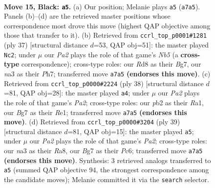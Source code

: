 \documentclass[11pt]{article}
\begin{document}
\clearpage

\begin{figure}[p]\centering
\begin{subfigure}{0.46\textwidth}\centering
\resizebox{\linewidth}{!}{%
\newchessgame
\chessboard[
  setfen={2kr2r1/ppp1ppbp/1n4p1/4n3/7P/NB3P2/PPP1KP2/R1B3R1 b - - 1 15},
  showmover=false,
  pgfstyle=straightmove, color=movearrow, markmove={a7-a5}
]}
\caption{}
\end{subfigure}\hfill
\begin{subfigure}{0.46\textwidth}\centering
\resizebox{\linewidth}{!}{%
\newchessgame
\chessboard[
  setfen={r2r2k1/pp3pbp/3P1np1/P3p3/1np5/2N2B1P/1P3PP1/R1BR2K1 b - - 0 19},
  showmover=false,
  pgfstyle=straightmove, color=movearrow, markmove={b4-c2}
]}
\caption{}
\end{subfigure}
\\[4pt]
\begin{subfigure}{0.46\textwidth}\centering
\resizebox{\linewidth}{!}{%
\newchessgame
\chessboard[
  setfen={4rbk1/5pp1/r1p4p/p1pnNb2/2N5/2P3B1/PP3PPP/R3R1K1 w - - 4 20},
  showmover=false,
  pgfstyle=straightmove, color=movearrow, markmove={a2-a4}
]}
\caption{}
\end{subfigure}\hfill
\begin{subfigure}{0.46\textwidth}\centering
\resizebox{\linewidth}{!}{%
\newchessgame
\chessboard[
  setfen={r3r3/p2k1p2/1np4p/3n1bp1/P2Pp3/1B5P/P3NPP1/R1B2RK1 b - - 0 20},
  showmover=false,
  pgfstyle=straightmove, color=movearrow, markmove={a7-a5}
]}
\caption{}
\end{subfigure}
\caption{\textbf{Move 15, Black: \texttt{a5}.} (a) Our position; Melanie plays \texttt{a5} (\texttt{a7a5}). Panels (b)--(d) are the retrieved master positions whose correspondence most drove this move (highest QAP objective among those that transfer to it). (b) Retrieved from \texttt{ccrl\_top\_p0001\#1281} (ply 37) [structural distance $d$=53, QAP obj=51]: the master played \texttt{Nc2}; under $\mu$ our \emph{Pa2} plays the role of that game's \emph{Nb5} (a \textbf{cross-type} correspondence); cross-type roles: our \emph{R}d8 as their \emph{B}g7, our \emph{n}a3 as their \emph{P}h7; transferred move \texttt{a7a5} \textbf{(endorses this move)}. (c) Retrieved from \texttt{ccrl\_top\_p0000\#2224} (ply 38) [structural distance $d$=81, QAP obj=28]: the master played \texttt{a4}; under $\mu$ our \emph{Pa2} plays the role of that game's \emph{Pa2}; cross-type roles: our \emph{p}b2 as their \emph{R}a1, our \emph{B}g7 as their \emph{R}e1; transferred move \texttt{a7a5} \textbf{(endorses this move)}. (d) Retrieved from \texttt{ccrl\_top\_p0000\#3204} (ply 39) [structural distance $d$=81, QAP obj=15]: the master played \texttt{a5}; under $\mu$ our \emph{Pa2} plays the role of that game's \emph{Pa2}; cross-type roles: our \emph{n}a3 as their \emph{R}a8, our \emph{B}g7 as their \emph{P}c6; transferred move \texttt{a7a5} \textbf{(endorses this move)}. Synthesis: 3 retrieved analogs transferred to \texttt{a5} (summed QAP objective 94, the strongest correspondence among the candidate moves); Melanie committed it via the \texttt{search} selector.}
\label{fig:thought-m29}
\end{figure}
\end{document}

